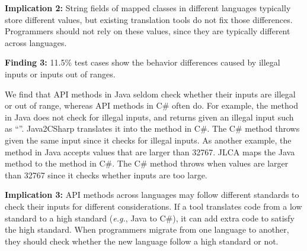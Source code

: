 \textbf{Implication 2:} String fields of mapped classes in different languages typically store different values, but existing translation tools do not fix those differences. Programmers should not rely on these values, since they are typically different across languages.

\textbf{Finding 3:} 11.5\% test cases show the behavior differences caused by illegal inputs or inputs out of ranges.

We find that API methods in Java seldom check whether their inputs are illegal or out of range, whereas API methods in C\# often do. For example, the  method in Java does not check for illegal inputs, and returns  given an illegal input such as ``''. Java2CSharp translates it into the  method in C\#. The C\# method throws  given the same input since it checks for illegal inputs. As another example, the  method in Java accepts values that are larger than 32767. JLCA maps the Java method to the  method in C\#. The C\# method throws  when values are larger than 32767 since it checks whether inputs are too large.

\textbf{Implication 3:} API methods across languages may follow different standards to check their inputs for different considerations. If a tool translates code from a low standard to a high standard (\emph{e.g.}, Java to C\#), it can add extra code to satisfy the high standard. When programmers migrate from one language to another, they should check whether the new language follow a high standard or not.

